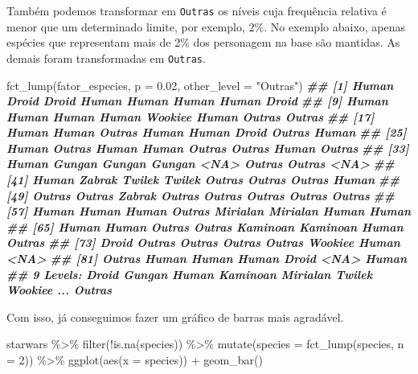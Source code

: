 \documentclass[
]{book}
\newenvironment{Shaded}{\begin{snugshade}}{\end{snugshade}}
\newcommand{\AttributeTok}[1]{\textcolor[rgb]{0.77,0.63,0.00}{#1}}
\newcommand{\DecValTok}[1]{\textcolor[rgb]{0.00,0.00,0.81}{#1}}
\newcommand{\DocumentationTok}[1]{\textcolor[rgb]{0.56,0.35,0.01}{\textbf{\textit{#1}}}}
\newcommand{\FloatTok}[1]{\textcolor[rgb]{0.00,0.00,0.81}{#1}}
\newcommand{\FunctionTok}[1]{\textcolor[rgb]{0.00,0.00,0.00}{#1}}
\newcommand{\NormalTok}[1]{#1}
\newcommand{\SpecialCharTok}[1]{\textcolor[rgb]{0.00,0.00,0.00}{#1}}
\newcommand{\StringTok}[1]{\textcolor[rgb]{0.31,0.60,0.02}{#1}}
\begin{document}
Também podemos transformar em \texttt{Outras} os níveis cuja frequência relativa é menor que um determinado limite, por exemplo, 2\%. No exemplo abaixo, apenas espécies que representam mais de 2\% dos personagem na base são mantidas. As demais foram transformadas em \texttt{Outras}.

\begin{Shaded}
\begin{Highlighting}[]
\FunctionTok{fct\_lump}\NormalTok{(fator\_especies, }\AttributeTok{p =} \FloatTok{0.02}\NormalTok{, }\AttributeTok{other\_level =} \StringTok{"Outras"}\NormalTok{)}
\DocumentationTok{\#\#  [1] Human    Droid    Droid    Human    Human    Human    Human    Droid   }
\DocumentationTok{\#\#  [9] Human    Human    Human    Human    Wookiee  Human    Outras   Outras  }
\DocumentationTok{\#\# [17] Human    Human    Outras   Human    Human    Droid    Outras   Human   }
\DocumentationTok{\#\# [25] Human    Outras   Human    Human    Outras   Outras   Human    Outras  }
\DocumentationTok{\#\# [33] Human    Gungan   Gungan   Gungan   \textless{}NA\textgreater{}     Outras   Outras   \textless{}NA\textgreater{}    }
\DocumentationTok{\#\# [41] Human    Zabrak   Twi\textquotesingle{}lek  Twi\textquotesingle{}lek  Outras   Outras   Outras   Human   }
\DocumentationTok{\#\# [49] Outras   Outras   Zabrak   Outras   Outras   Outras   Outras   Outras  }
\DocumentationTok{\#\# [57] Human    Human    Human    Outras   Mirialan Mirialan Human    Human   }
\DocumentationTok{\#\# [65] Human    Human    Outras   Outras   Kaminoan Kaminoan Human    Outras  }
\DocumentationTok{\#\# [73] Droid    Outras   Outras   Outras   Outras   Wookiee  Human    \textless{}NA\textgreater{}    }
\DocumentationTok{\#\# [81] Outras   Human    Human    Human    Droid    \textless{}NA\textgreater{}     Human   }
\DocumentationTok{\#\# 9 Levels: Droid Gungan Human Kaminoan Mirialan Twi\textquotesingle{}lek Wookiee ... Outras}
\end{Highlighting}
\end{Shaded}

Com isso, já conseguimos fazer um gráfico de barras mais agradável.

\begin{Shaded}
\begin{Highlighting}[]
\NormalTok{starwars }\SpecialCharTok{\%\textgreater{}\%} 
  \FunctionTok{filter}\NormalTok{(}\SpecialCharTok{!}\FunctionTok{is.na}\NormalTok{(species)) }\SpecialCharTok{\%\textgreater{}\%} 
  \FunctionTok{mutate}\NormalTok{(}\AttributeTok{species =} \FunctionTok{fct\_lump}\NormalTok{(species, }\AttributeTok{n =} \DecValTok{2}\NormalTok{)) }\SpecialCharTok{\%\textgreater{}\%} 
  \FunctionTok{ggplot}\NormalTok{(}\FunctionTok{aes}\NormalTok{(}\AttributeTok{x =}\NormalTok{ species)) }\SpecialCharTok{+}
  \FunctionTok{geom\_bar}\NormalTok{()}
\end{Highlighting}
\end{Shaded}
\end{document}

